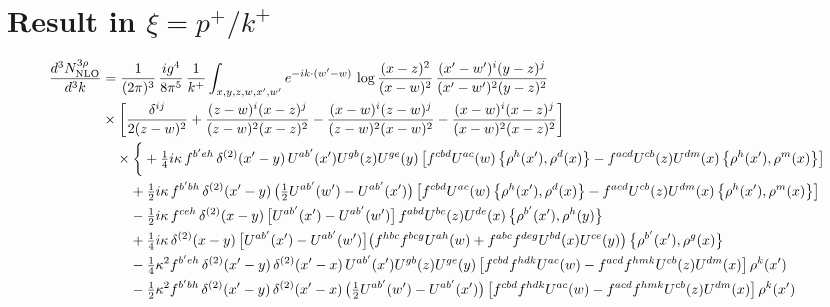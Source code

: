 \documentclass[10pt]{article}
\numberwithin{equation}{section}
\begin{document}
\section{Result in $\xi=p^{+}/k^{+}$}
\begin{align}
\frac{d^{3}N^{3\rho}_{\rm NLO}}{d^{3}k}&=\frac{1}{(2\pi)^{3}}\,\frac{ig^{4}}{8\pi^{5}}\,\frac{1}{k^{+}}\int_{x,y,z,w,x^{\prime},w^{\prime}}e^{-ik\cdot(w^{\prime}-w)}\,\log\frac{(x-z)^{2}}{(x-w)^{2}}\,\frac{(x^{\prime}-w^{\prime})^{i}(y-z)^{j}}{(x^{\prime}-w^{\prime})^{2}(y-z)^{2}}\notag\\
&\times\bigg[\frac{\delta^{ij}}{2(z-w)^{2}}+\frac{(z-w)^{i}(x-z)^{j}}{(z-w)^{2}(x-z)^{2}}-\frac{(x-w)^{i}(z-w)^{j}}{(z-w)^{2}(x-w)^{2}}-\frac{(x-w)^{i}(x-z)^{j}}{(x-w)^{2}(x-z)^{2}}\bigg]\notag\\
&\quad\times\bigg\{+\tfrac14 i\kappa\,f^{b^{\prime}eh}\,\delta^{(2)}(x^{\prime}-y)\,U^{ab^{\prime}}(x^{\prime})U^{gb}(z)U^{ge}(y)\,\big[f^{cbd}U^{ac}(w)\,\big\{\rho^{h}(x^{\prime}),\rho^{d}(x)\big\}-f^{acd}U^{cb}(z)U^{dm}(x)\,\big\{\rho^{h}(x^{\prime}),\rho^{m}(x)\big\}\big]\notag\\
&\qquad+\tfrac12 i\kappa\,f^{b^{\prime}bh}\,\delta^{(2)}(x^{\prime}-y)\,\big(\tfrac12U^{ab^{\prime}}(w^{\prime})-U^{ab^{\prime}}(x^{\prime})\big)\,\big[f^{cbd}U^{ac}(w)\,\big\{\rho^{h}(x^{\prime}),\rho^{d}(x)\big\}-f^{acd}U^{cb}(z)U^{dm}(x)\,\big\{\rho^{h}(x^{\prime}),\rho^{m}(x)\big\}\big]\notag\\
&\qquad-\tfrac12 i\kappa\,f^{ceh}\,\delta^{(2)}(x-y)\,\big[U^{ab^{\prime}}(x^{\prime})-U^{ab^{\prime}}(w^{\prime})\big]\,f^{abd}U^{bc}(z)U^{de}(x)\,\big\{\rho^{b^{\prime}}(x^{\prime}),\rho^{h}(y)\big\}\notag\\
&\qquad+\tfrac14 i\kappa\,\delta^{(2)}(x-y)\,\big[U^{ab^{\prime}}(x^{\prime})-U^{ab^{\prime}}(w^{\prime})\big]\big(f^{hbc}f^{bcg}U^{ah}(w)+f^{abc}f^{deg}U^{bd}(x)U^{ce}(y)\big)\,\big\{\rho^{b^{\prime}}(x^{\prime}),\rho^{g}(x)\big\}\notag\\
&\qquad-\tfrac14\kappa^{2}f^{b^{\prime}eh}\,\delta^{(2)}(x^{\prime}-y)\,\delta^{(2)}(x^{\prime}-x)\,U^{ab^{\prime}}(x^{\prime})U^{gb}(z)U^{ge}(y)\,\big[f^{cbd}f^{hdk}U^{ac}(w)-f^{acd}f^{hmk}U^{cb}(z)U^{dm}(x)\big]\,\rho^{k}(x^{\prime})\notag\\
&\qquad-\tfrac12\kappa^{2}f^{b^{\prime}bh}\,\delta^{(2)}(x^{\prime}-y)\,\delta^{(2)}(x^{\prime}-x)\,\big(\tfrac12U^{ab^{\prime}}(w^{\prime})-U^{ab^{\prime}}(x^{\prime})\big)\,\big[f^{cbd}f^{hdk}U^{ac}(w)-f^{acd}f^{hmk}U^{cb}(z)U^{dm}(x)\big]\,\rho^{k}(x^{\prime})\notag\\

\end{align}
\end{document}
